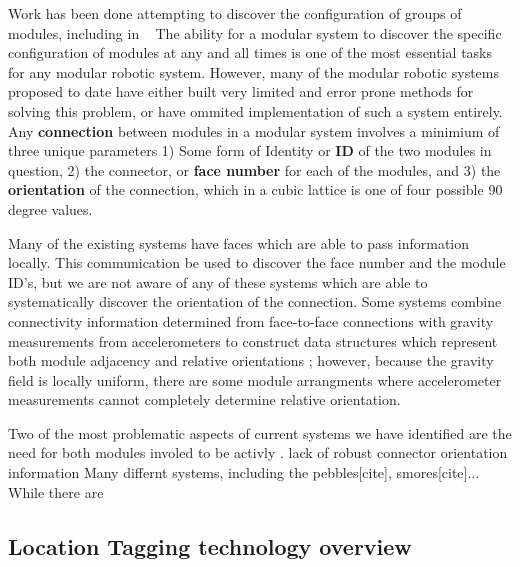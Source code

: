 	Work has been done attempting to discover the configuration of groups of modules, including in ~\cite{park2008automatic}
	The ability for a modular system to discover the specific configuration of modules at any and all times is one of the most essential tasks for any modular robotic system. However, many of the modular robotic systems proposed to date have either built very limited and error prone methods for solving this problem, or have ommited implementation of such a system entirely. Any \textbf{connection} between modules in a modular system involves a minimium of three unique parameters 1) Some form of Identity or \textbf{ID} of the two modules in question, 2) the connector, or \textbf{face number} for each of the modules, and 3) the \textbf{orientation} of the connection, which in a cubic lattice is one of four possible 90 degree values.

	Many of the existing systems have faces which are able to pass information locally. This communication be used to discover the face number and the module ID's, but we are not aware of any of these systems which are able to systematically discover the orientation of the connection. Some systems combine connectivity information determined from face-to-face connections with gravity measurements from accelerometers to construct data structures which represent both module adjacency and relative orientations \cite{Neubert2016}; however, because the gravity field is locally uniform, there are some module arrangments where accelerometer measurements cannot completely determine relative orientation.

	Two of the most problematic aspects of current systems we have identified are the need for both modules involed to be activly . lack of robust connector orientation information
	Many differnt systems, including the pebbles[cite], smores[cite]... While there are


\subsection{Location Tagging technology overview}
\label{sec:RWtaggingTech}

